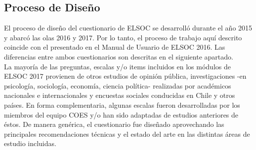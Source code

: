 \documentclass[12pt]{report}
\begin{document}
\subsection*{Proceso de Diseño}

El proceso de diseño del cuestionario de ELSOC se desarrolló durante el año 2015 y abarcó las olas 2016 y 2017. Por lo tanto, el proceso de trabajo aquí descrito coincide con el presentado en el Manual de Usuario de ELSOC 2016. Las diferencias entre ambos cuestionarios son descritas en el siguiente apartado.\\

La mayoría de las preguntas, escalas y/o items incluidos en los módulos de ELSOC 2017 provienen de otros estudios de opinión pública, investigaciones -en psicología, sociología, economía, ciencia política- realizadas por académicos nacionales e internacionales y encuestas sociales conducidas en Chile y otros países. En forma complementaria, algunas escalas fueron desarrolladas por los miembros del equipo COES y/o han sido adaptadas de estudios anteriores de éstos. De manera genérica, el cuestionario fue diseñado aprovechando las principales recomendaciones técnicas y el estado del arte en las distintas áreas de estudio incluidas.\\
\end{document}
